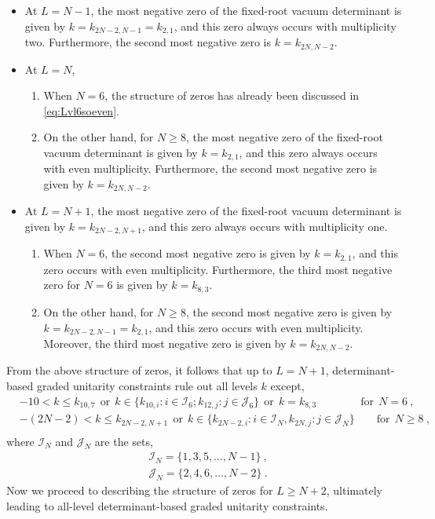 \begin{itemize}
    \item At $L = N-1$, the most negative zero of the fixed-root vacuum determinant is given by $k = k_{2N-2, N-1} = k_{2,1}$, and this zero always occurs with multiplicity two. Furthermore, the second most negative zero is $k = k_{2N, N-2}$. 
    \item At $L = N$, 
    \begin{enumerate}
        \item When $N = 6$, the structure of zeros has already been discussed in \eqref{eq:Lvl6soeven}.
        \item On the other hand, for $N \geqslant 8$, the most negative zero of the fixed-root vacuum determinant is given by $k = k_{2,1}$, and this zero always occurs with even multiplicity. Furthermore, the second most negative zero is given by $k = k_{2N, N-2}$. 
    \end{enumerate}
    \item At $L = N+1$, the most negative zero of the fixed-root vacuum determinant is given by $k = k_{2N-2,N+1}$, and this zero always occurs with multiplicity one. 
    \begin{enumerate}
        \item When $N = 6$, the second most negative zero is given by $k = k_{2,1}$, and this zero occurs with even multiplicity. Furthermore, the third most negative zero for $N = 6$ is given by $k = k_{8,3}$. 
        \item On the other hand, for $N \geqslant 8$, the second most negative zero is given by $k = k_{2N-2, N-1} = k_{2,1}$, and this zero occurs with even multiplicity. Moreover, the third most negative zero is given by $k = k_{2N, N-2}$.   
    \end{enumerate}
\end{itemize}
From the above structure of zeros, it follows that up to $L = N+1$, determinant-based graded unitarity constraints rule out all levels $k$ except,
\begin{equation} \label{eq:so4nlevellessNp2}
\begin{split}
    &-10 < k \leqslant k_{10,7} \ \ \text{or} \ \ k \in \{k_{10,i}: i \in \mathcal{I}_6; k_{12,j}: j \in \mathcal{J}_6\} \ \ \text{or} \ \ k = k_{8,3} \qquad \qquad \text{for} \ \ N=6~, \\
    &-(2N-2) < k \leqslant k_{2N-2,N+1} \ \ \text{or} \ \ k \in \{k_{2N-2,i}: i \in \mathcal{I}_N, k_{2N,j}: j \in \mathcal{J}_N \} \qquad \text{for} \ \ N \geqslant 8~, \\
\end{split}
\end{equation}
where $\mathcal{I}_N$ and $\mathcal{J}_N$ are the sets,
\begin{equation}
\begin{split}
    &\mathcal{I}_N = \{1, 3, 5, \ldots, N-1\}~, \\ 
    &\mathcal{J}_N = \{2, 4, 6, \ldots, N-2\}~.
\end{split}
\end{equation}
Now we proceed to describing the structure of zeros for $L \geqslant N+2$, ultimately leading to all-level determinant-based graded unitarity constraints. 

